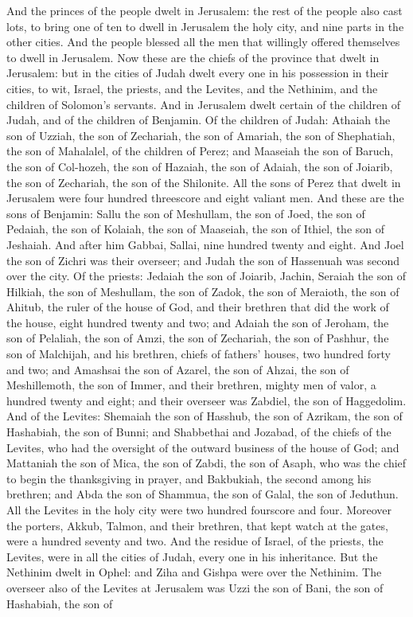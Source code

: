 And the princes of the people dwelt in Jerusalem: the rest of the people also cast lots, to bring one of ten to dwell in Jerusalem the holy city, and nine parts in the other cities. And the people blessed all the men that willingly offered themselves to dwell in Jerusalem.  Now these are the chiefs of the province that dwelt in Jerusalem: but in the cities of Judah dwelt every one in his possession in their cities, to wit, Israel, the priests, and the Levites, and the Nethinim, and the children of Solomon’s servants. And in Jerusalem dwelt certain of the children of Judah, and of the children of Benjamin. Of the children of Judah: Athaiah the son of Uzziah, the son of Zechariah, the son of Amariah, the son of Shephatiah, the son of Mahalalel, of the children of Perez; and Maaseiah the son of Baruch, the son of Col-hozeh, the son of Hazaiah, the son of Adaiah, the son of Joiarib, the son of Zechariah, the son of the Shilonite. All the sons of Perez that dwelt in Jerusalem were four hundred threescore and eight valiant men.  And these are the sons of Benjamin: Sallu the son of Meshullam, the son of Joed, the son of Pedaiah, the son of Kolaiah, the son of Maaseiah, the son of Ithiel, the son of Jeshaiah. And after him Gabbai, Sallai, nine hundred twenty and eight. And Joel the son of Zichri was their overseer; and Judah the son of Hassenuah was second over the city.  Of the priests: Jedaiah the son of Joiarib, Jachin, Seraiah the son of Hilkiah, the son of Meshullam, the son of Zadok, the son of Meraioth, the son of Ahitub, the ruler of the house of God, and their brethren that did the work of the house, eight hundred twenty and two; and Adaiah the son of Jeroham, the son of Pelaliah, the son of Amzi, the son of Zechariah, the son of Pashhur, the son of Malchijah, and his brethren, chiefs of fathers’ houses, two hundred forty and two; and Amashsai the son of Azarel, the son of Ahzai, the son of Meshillemoth, the son of Immer, and their brethren, mighty men of valor, a hundred twenty and eight; and their overseer was Zabdiel, the son of Haggedolim.  And of the Levites: Shemaiah the son of Hasshub, the son of Azrikam, the son of Hashabiah, the son of Bunni; and Shabbethai and Jozabad, of the chiefs of the Levites, who had the oversight of the outward business of the house of God; and Mattaniah the son of Mica, the son of Zabdi, the son of Asaph, who was the chief to begin the thanksgiving in prayer, and Bakbukiah, the second among his brethren; and Abda the son of Shammua, the son of Galal, the son of Jeduthun. All the Levites in the holy city were two hundred fourscore and four.  Moreover the porters, Akkub, Talmon, and their brethren, that kept watch at the gates, were a hundred seventy and two. And the residue of Israel, of the priests, the Levites, were in all the cities of Judah, every one in his inheritance. But the Nethinim dwelt in Ophel: and Ziha and Gishpa were over the Nethinim.  The overseer also of the Levites at Jerusalem was Uzzi the son of Bani, the son of Hashabiah, the son of 